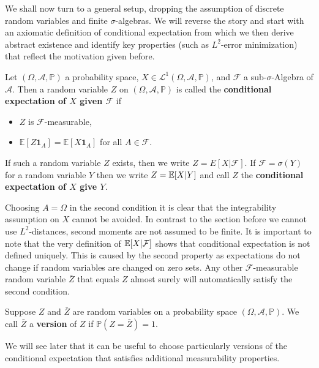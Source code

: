We shall now turn to a general setup, dropping the assumption of discrete random variables and finite $\sigma$-algebras. We will reverse the story and start with an axiomatic definition of conditional expectation from which we then derive abstract existence and identify key properties (such as $L^2$-error minimization) that reflect the motivation given before. 

\begin{ldefwichtig}
\begin{deff}\label{deff_condexp}
	Let $(\Omega, \mathcal A, \mathbb P)$ a probability space, $X\in \mathcal L^1(\Omega, \mathcal A, \mathbb P)$, and $\mathcal F$ a sub-$\sigma$-Algebra of $\mathcal A$. Then a random variable $Z$  on $(\Omega, \mathcal A, \mathbb P)$ is called the \textbf{conditional expectation of $X$ given $\mathcal F$} if
	\begin{itemize}
		\item $Z$ is $\mathcal F$-measurable,
		\item $\mathbb E[Z \mathbf 1_A]=\mathbb E[X \mathbf 1_A]$ for all $A\in \mathcal F$.
	\end{itemize}
	If such a random variable $Z$ exists, then we write $Z=E[X|\mathcal F]$. If $\mathcal F=\sigma(Y)$ for a  random variable $Y$ then we write $Z=\mathbb{E}[X|Y]$ and call $Z$ the \textbf{conditional expectation of $X$ give $Y$}.
\end{deff}
\end{ldefwichtig}
Choosing $A=\Omega$ in the second condition it is clear that the integrability assumption on $X$ cannot be avoided. In contrast to the section before we cannot use $L^2$-distances, second moments are not assumed to be finite. It is important to note that the very definition of $\mathbb{E}[X|\mathcal F]$ shows that conditional expectation is not defined uniquely. This is caused by the second property as expectations do not change if random variables are changed on zero sets. Any other $\mathcal F$-measurable random variable $\bar Z$ that equals $Z$ almost surely will automatically satisfy the second condition.
\begin{ldef}
\begin{deff}
	Suppose $Z$ and $\bar Z$ are random variables on a probability space $(\Omega, \mathcal A, \mathbb P)$. We call $\bar Z$ a \textbf{version} of $Z$ if $\mathbb P(Z=\bar Z)=1$.
\end{deff}
\end{ldef}
We will see later that it can be useful to choose particularly versions of the conditional expectation that satisfies additional measurability properties.

